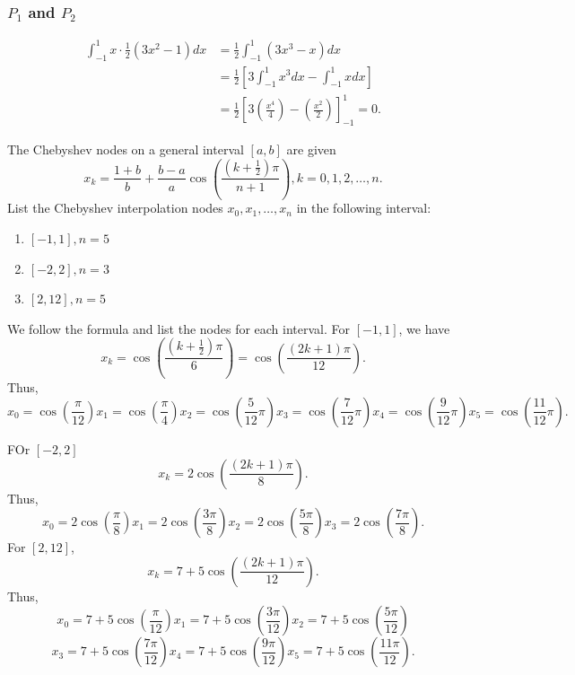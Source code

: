 \documentclass[5pt, a4paper]{article}
\begin{document}
\subsubsection*{$P_1$ and $P_2$}
\begin{align*}
    \int_{-1}^1 x \cdot \frac{1}{2}(3x^2 - 1) dx 
    &= \frac{1}{2} \int_{-1}^1 (3x^3 - x) dx\\
    &= \frac{1}{2} \left[ 3\int_{-1}^{1}x^3dx - \int_{-1}^{1} xdx  \right] \\
    &= \frac{1}{2} \left[ 3 \left( \frac{x^4}{4} \right) -
    \left(\frac{x^2}{2}\right) \right]_{-1}^{1} = 0
.\end{align*}
\begin{tcolorbox}[title=Question 3]
    The Chebyshev nodes on a general interval $[a,b]$ are given  \[
        x_k = \frac{1+b}{b} + \frac{b - a}{a} \cos \left(
        \frac{(k+\frac{1}{2})\pi}{n+1} \right) 
    ,k = 0,1,2,\ldots,n.\] 
    List the Chebyshev interpolation nodes $x_0,x_1,\ldots,x_n$ in the following
    interval:
    \begin{enumerate}[label=\alph*)]
        \item $[-1,1], n = 5$
        \item $[-2,2], n = 3$
        \item $[2,12], n = 5$
    \end{enumerate}
\end{tcolorbox}
We follow the formula and list the nodes for each interval. For $[-1,1]$, we
have  \[
x_k = \cos\left( \frac{(k+\frac{1}{2})\pi}{6} \right) = \cos\left( \frac{(2k +
1)\pi}{12} \right)
.\] 
Thus, \[
    x_0 = \cos \left( \frac{\pi}{12} \right) 
x_1 = \cos\left( \frac{\pi}{4} \right) x_2 = \cos\left( \frac{5}{12}\pi \right)  
x_3 = \cos\left( \frac{7}{12} \pi  \right) 
x_4 = \cos \left( \frac{9}{12} \pi \right) 
x_5 = \cos \left( \frac{11}{12} \pi \right) 
.\] 

FOr $[-2,2]$ \[
x_k  = 2\cos \left( \frac{(2k+1)\pi}{8} \right) 
.\] 
Thus, 
\[
x_0 = 2\cos \left( \frac{\pi}{8} \right) 
x_1 = 2\cos \left( \frac{3\pi}{8} \right) 
x_2 = 2\cos \left( \frac{5\pi}{8} \right) 
x_3 = 2\cos \left( \frac{7\pi}{8} \right) 
.\] 
For $[2,12]$,  \[
    x_k = 7 + 5 \cos \left( \frac{(2k + 1) \pi}{12}\right) 
.\] 
Thus, \[
x_0 = 7 + 5 \cos\left( \frac{\pi}{12} \right) 
x_1 = 7 + 5 \cos\left( \frac{3\pi}{12} \right) 
x_2 = 7 + 5 \cos\left( \frac{5\pi}{12} \right) 
\]
\[
x_3 = 7 + 5 \cos\left( \frac{7\pi}{12} \right) 
x_4 = 7 + 5 \cos\left( \frac{9\pi}{12} \right) 
x_5 = 7 + 5 \cos\left( \frac{11\pi}{12} \right) 
.\] 
\end{document}
